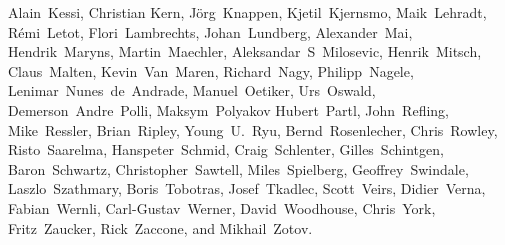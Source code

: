 {Alain~Kessi,            %
Christian Kern,         %
J\"org~Knappen,         %
Kjetil~Kjernsmo,        %
Maik~Lehradt,           %
R\'emi~Letot,           %
Flori~Lambrechts,       %
Johan~Lundberg,         %
Alexander~Mai,          %
Hendrik~Maryns,         %
Martin~Maechler,        %
Aleksandar~S~Milosevic, %
Henrik~Mitsch,          %
Claus~Malten,           %
Kevin~Van~Maren,        %
Richard~Nagy,           %
Philipp~Nagele,         %
Lenimar~Nunes~de~Andrade, %
Manuel~Oetiker,         %
Urs~Oswald,             %
Demerson~Andre~Polli,   %
Maksym~Polyakov         %
Hubert~Partl,           %
John~Refling,           %
Mike~Ressler,           %
Brian~Ripley,           %
Young~U.~Ryu,           %
Bernd~Rosenlecher,      %
Chris~Rowley,           %
Risto~Saarelma,         %
Hanspeter~Schmid,       %
Craig~Schlenter,        %
Gilles~Schintgen,       %
Baron~Schwartz,         %
Christopher~Sawtell,    %
Miles~Spielberg,        %
Geoffrey~Swindale,      %
Laszlo~Szathmary,       %
Boris~Tobotras,         %
Josef~Tkadlec,          %
Scott~Veirs,            %
Didier~Verna,           %
Fabian~Wernli,          %
Carl-Gustav~Werner,     %
David~Woodhouse,        %
Chris~York,             %
Fritz~Zaucker,          %
Rick~Zaccone,           %
and Mikhail~Zotov.      %

}




\pagebreak
\endinput
%

